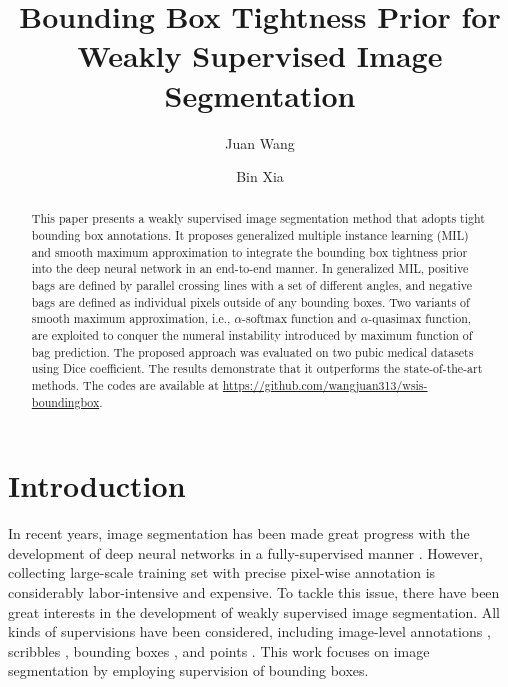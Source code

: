 \documentclass[runningheads]{llncs}
\begin{document}
\title{Bounding Box Tightness Prior for Weakly Supervised Image Segmentation}
\author{Juan Wang \and
Bin Xia}
\maketitle              \begin{abstract}
This paper presents a weakly supervised image segmentation method that adopts tight bounding box annotations. It proposes generalized multiple instance learning (MIL) and smooth maximum approximation to integrate the bounding box tightness prior into the deep neural network in an end-to-end manner. In generalized MIL, positive bags are defined by parallel crossing lines with a set of different angles, and negative bags are defined as individual pixels outside of any bounding boxes. Two variants of smooth maximum approximation, i.e., $\alpha$-softmax function and $\alpha$-quasimax function, are exploited to conquer the numeral instability introduced by maximum function of bag prediction. The proposed approach was evaluated on two pubic medical datasets using Dice coefficient. The results demonstrate that it outperforms the state-of-the-art methods. The codes are available at \url{https://github.com/wangjuan313/wsis-boundingbox}.

\end{abstract}


\section{Introduction}

In recent years, image segmentation has been made great progress with the development of deep neural networks in a fully-supervised manner \cite{ronneberger2015u,long2015fully,chen2018encoder}. However, collecting large-scale training set with precise pixel-wise annotation is considerably labor-intensive and expensive. To tackle this issue, there have been great interests in the development of weakly supervised image segmentation. All kinds of supervisions have been considered, including image-level annotations \cite{ahn2019weakly,wang2020self}, scribbles \cite{lin2016scribblesup}, bounding boxes \cite{rajchl2016deepcut,kervadec2020bounding}, and points \cite{bearman2016s}. This work focuses on image segmentation by employing supervision of bounding boxes. 
\end{document}
